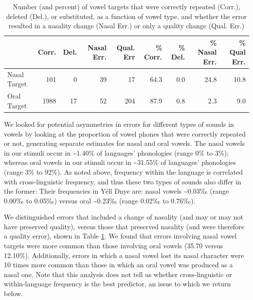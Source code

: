 \documentclass[
  american,
  ,man,floatsintext]{apa6}
\begin{document}
\begin{table}

\caption{\label{tab:tab-v}Number (and percent) of vowel targets that were correctly repeated (Corr.), deleted (Del.), or substituted, as a function of vowel type, and whether the error resulted in a nasality change (Nasal Err.) or only a quality change (Qual. Err.)}
\centering
\begin{tabular}[t]{lrrrrrrrr}
\toprule
  & Corr. & Del. & Nasal Err. & Qual. Err & \% Corr. & \% Del. & \% Nasal Err. & \% Qual Err.\\
\midrule
Nasal Target & 101 & 0 & 39 & 17 & 64.3 & 0.0 & 24.8 & 10.8\\
Oral Target & 1988 & 17 & 52 & 204 & 87.9 & 0.8 & 2.3 & 9.0\\
\bottomrule
\end{tabular}
\end{table}

We looked for potential asymmetries in errors for different types of sounds in vowels by looking at the proportion of vowel phones that were correctly repeated or not, generating separate estimates for nasal and oral vowels. The nasal vowels in our stimuli occur in \textasciitilde1.40\% of languages' phonologies (range 0\% to 3\%);
whereas oral vowels in our stimuli occur in \textasciitilde31.55\% of languages' phonologies (range 3\% to 92\%).
As noted above, frequency within the language is correlated with cross-linguistic frequency, and thus these two types of sounds also differ in the former: Their frequencies in Yélî Dnye are: nasal vowels \textasciitilde0.03‰ (range 0.00‰ to 0.05‰) versus oral \textasciitilde0.23‰ (range 0.02‰ to 0.76‰).

We distinguished errors that included a change of nasality (and may or may not have preserved quality), versus those that preserved nasality (and were therefore a quality error), shown in Table \ref{tab:tab-v}. We found that errors involving nasal vowel targets were more common than those involving oral vowels (35.70 versus 12.10\%). Additionally, errors in which a nasal vowel lost its nasal character were 10 times more common than those in which an oral vowel was produced as a nasal one. Note that this analysis does not tell us whether cross-linguistic or within-language frequency is the best predictor, an issue to which we return below.
\end{document}
